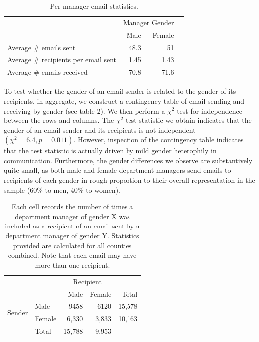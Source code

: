 \documentclass{pnastwo}
\begin{document}
\begin{article}
\begin{table}
  \centering
  \begin{tabular}{m{2.1in}rrr}
    \toprule
    & \multicolumn{2}{c}{Manager Gender} \\
    \cmidrule{2-3}
    & Male & Female  \\
    \midrule
    Average \# emails sent & 48.3 & 51 \\
    Average \# recipients per email sent & 1.45 & 1.43 \\
    \midrule
    Average \# emails received & 70.8 & 71.6 \\
    \bottomrule
  \end{tabular}
  \caption{\label{tab:email agg stats} Per-manager email
    statistics.}
\end{table}

To test whether the gender of an email sender is related to the gender of its recipients, in aggregate, we construct a contingency table of email sending and receiving by gender (see table \ref{tab:gender email agg stats}). We then perform a $\chi^2$ test for independence between the rows and columns. The $\chi^2$ test statistic we obtain indicates that the gender of an email sender and its recipients is not independent $(\chi^2 = 6.4, p = 0.011)$. However, inspection of the contingency table indicates that the test statistic is actually driven by mild gender heterophily in communication. Furthermore, the gender differences we observe are substantively quite small, as both male and female department managers send emails to recipients of each gender in rough proportion to their overall representation in the sample (60\% to men, 40\% to women).  
	
	\begin{table}
	\centering
	\begin{tabular}{rlrrr}
	  \toprule
		 && \multicolumn{2}{c}{Recipient} \\
		\cmidrule{3-4}
	& & Male & Female & Total  \\
		 \midrule
		\multirow{2}{*}{Sender} & Male &  9458 & 6120  & 15,578 \\
	& Female & 6,330 & 3,833 & 10,163 \\
	\midrule
		 & Total & 15,788 & 9,953 & \\
		\bottomrule
		\end{tabular}
		\caption{\label{tab:gender email agg stats}Each cell records the number of times a department manager of gender X was included as a recipient of an email sent by a department manager of gender Y. Statistics provided are calculated for all counties combined. Note that each email may have more than one recipient.}
	\end{table}


\end{article}
\end{document}
